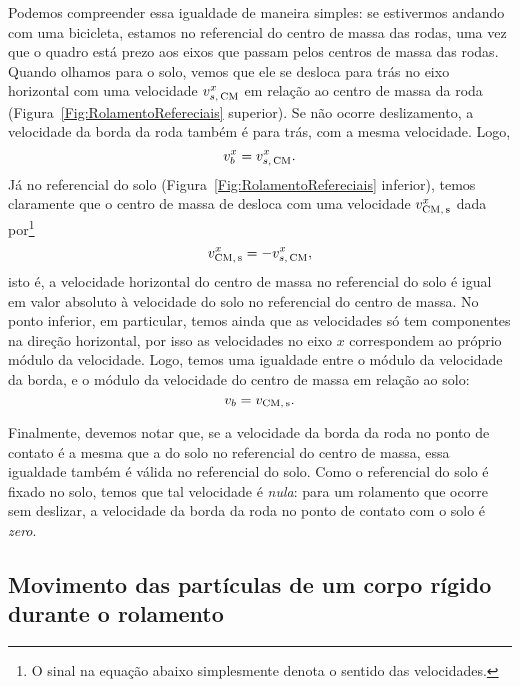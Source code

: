 Podemos compreender essa igualdade de maneira simples: se estivermos andando com uma bicicleta, estamos no referencial do centro de massa das rodas, uma vez que o quadro está prezo aos eixos que passam pelos centros de massa das rodas. Quando olhamos para o solo, vemos que ele se desloca para trás no eixo horizontal com uma velocidade $v_{s,\,\rm{CM}}^x$ em relação ao centro de massa da roda (Figura~\ref{Fig:RolamentoRefereciais} superior). Se não ocorre deslizamento, a velocidade da borda da roda também é para trás, com a mesma velocidade. Logo,
\begin{equation}
    v_b^x = v_{s,\,\rm{CM}}^x.
\end{equation}
%
Já no referencial do solo (Figura~\ref{Fig:RolamentoRefereciais} inferior), temos claramente que o centro de massa de desloca com uma velocidade $v_{\rm{CM},\,s}^x$ dada por\footnote{O sinal na equação abaixo simplesmente denota o sentido das velocidades.}
\begin{equation}
    v_{\rm{CM},\,s}^x = - v_{s,\,\rm{CM}}^x,
\end{equation}
%
isto é, a velocidade horizontal do centro de massa no referencial do solo é igual em valor absoluto à velocidade do solo no referencial do centro de massa. No ponto inferior, em particular, temos ainda que as velocidades só tem componentes na direção horizontal, por isso as velocidades no eixo $x$ correspondem ao próprio módulo da velocidade. Logo, temos uma igualdade entre o módulo da velocidade da borda, e o módulo da velocidade do centro de massa em relação ao solo:
\begin{equation}
    v_b = v_{\rm{CM},\,s}.
\end{equation}

Finalmente, devemos notar que, se a velocidade da borda da roda no ponto de contato é a mesma que a do solo no referencial do centro de massa, essa igualdade também é válida no referencial do solo. Como o referencial do solo é fixado no solo, temos que tal velocidade é \emph{nula}: para um rolamento que ocorre sem deslizar, a velocidade da borda da roda no ponto de contato com o solo é \emph{zero}.


\subsection{Movimento das partículas de um corpo rígido durante o rolamento}


